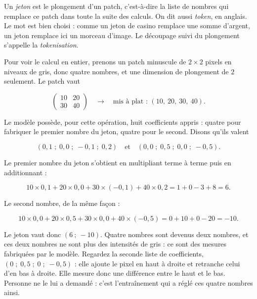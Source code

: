 \begin{definition}
Un \emph{jeton} est le plongement d'un patch, c'est-à-dire la liste de
nombres qui remplace ce patch dans toute la suite des calculs. On dit aussi
\emph{token}, en anglais. Le mot est bien choisi : comme un jeton de casino
remplace une somme d'argent, un jeton remplace ici un morceau d'image. Le
découpage suivi du plongement s'appelle la \emph{tokenisation}.
\end{definition}

\begin{exemple}
Pour voir le calcul en entier, prenons un patch minuscule de $2 \times 2$
pixels en niveaux de gris, donc quatre nombres, et une dimension de
plongement de $2$ seulement. Le patch vaut

\[
  \begin{pmatrix} 10 & 20 \\ 30 & 40 \end{pmatrix}
  \quad \longrightarrow \quad
  \text{mis à plat : } (10,\ 20,\ 30,\ 40).
\]

Le modèle possède, pour cette opération, huit coefficients appris : quatre
pour fabriquer le premier nombre du jeton, quatre pour le second. Disons
qu'ils valent

\[
  (0{,}1 \; ; \; 0{,}0 \; ; \; -0{,}1 \; ; \; 0{,}2)
  \quad \text{et} \quad
  (0{,}0 \; ; \; 0{,}5 \; ; \; 0{,}0 \; ; \; -0{,}5).
\]

Le premier nombre du jeton s'obtient en multipliant terme à terme puis en
additionnant :

\[
  10 \times 0{,}1 + 20 \times 0{,}0 + 30 \times (-0{,}1) + 40 \times 0{,}2
  = 1 + 0 - 3 + 8 = 6 .
\]

Le second nombre, de la même façon :

\[
  10 \times 0{,}0 + 20 \times 0{,}5 + 30 \times 0{,}0 + 40 \times (-0{,}5)
  = 0 + 10 + 0 - 20 = -10 .
\]

Le jeton vaut donc $(6\ ;\ -10)$. Quatre nombres sont devenus deux nombres,
et ces deux nombres ne sont plus des intensités de gris : ce sont des
mesures fabriquées par le modèle. Regardez la seconde liste de
coefficients, $(0 \; ; \; 0{,}5 \; ; \; 0 \; ; \; -0{,}5)$ : elle ajoute
le pixel en haut à droite et retranche celui d'en bas à droite. Elle mesure
donc une différence entre le haut et le bas. Personne ne le lui a demandé :
c'est l'entraînement qui a réglé ces quatre nombres ainsi.
\end{exemple}

